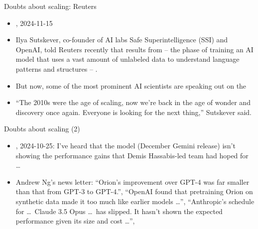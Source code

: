 

\begin{vbframe}{Doubts about scaling: Reuters}

\vfill

\begin{itemize}
\item {}, 2024-11-15
\item Ilya Sutskever, co-founder of AI labs Safe Superintelligence
	(SSI) and OpenAI, told Reuters recently that results
	from  -- the phase of training
	an AI model that uses a vast amount of unlabeled
	data to understand language patterns and structures
	-- .
	\item
But now, some of the most prominent AI scientists are
speaking out on the 
\item “The 2010s were the age of scaling, now we're back in
	the age of wonder and discovery once again. Everyone
	is looking for the next thing,” Sutskever
	said. 
\end{itemize}


\vfill

\end{vbframe}


\begin{vbframe}{Doubts about scaling (2)}

\vfill

\begin{itemize}
\item {}, 2024-10-25:
 I've heard that the model (December Gemini release) isn't showing the
	performance
        gains that Demis Hassabis-led team had hoped for \ldots
\item Andrew Ng's news letter:
``Orion’s improvement over GPT-4 was
far smaller than that from GPT-3 to GPT-4.'',
``OpenAI found that pretraining Orion on
synthetic data made it too much like earlier models \ldots'',
``Anthropic’s schedule for \ldots\ Claude 3.5 Opus \ldots\
has slipped. It
hasn’t shown the expected performance given its size and
cost \ldots'',
\end{itemize}


\vfill

\end{vbframe}

